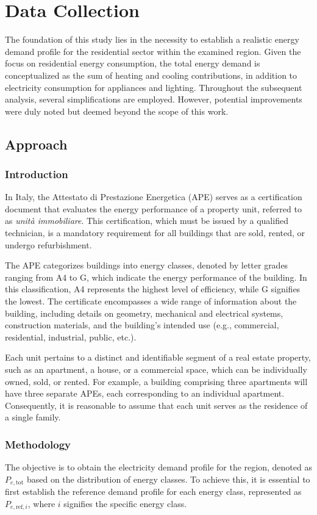 \section{Data Collection}
\label{sec:data-collection}
The foundation of this study lies in the necessity to establish a realistic energy demand profile for the residential sector within the examined region. Given the focus on residential energy consumption, the total energy demand is conceptualized as the sum of heating and cooling contributions, in addition to electricity consumption for appliances and lighting. Throughout the subsequent analysis, several simplifications are employed. However, potential improvements were duly noted but deemed beyond the scope of this work.

\subsection{Approach}
\subsubsection{Introduction}
In Italy, the Attestato di Prestazione Energetica (APE) serves as a certification document that evaluates the energy performance of a property unit, referred to as \textit{unità immobiliare}. This certification, which must be issued by a qualified technician, is a mandatory requirement for all buildings that are sold, rented, or undergo refurbishment.

The APE categorizes buildings into energy classes, denoted by letter grades ranging from A4 to G, which indicate the energy performance of the building. In this classification, A4 represents the highest level of efficiency, while G signifies the lowest. The certificate encompasses a wide range of information about the building, including details on geometry, mechanical and electrical systems, construction materials, and the building's intended use (e.g., commercial, residential, industrial, public, etc.).

Each unit pertains to a distinct and identifiable segment of a real estate property, such as an apartment, a house, or a commercial space, which can be individually owned, sold, or rented. For example, a building comprising three apartments will have three separate APEs, each corresponding to an individual apartment. Consequently, it is reasonable to assume that each unit serves as the residence of a single family.

\subsubsection{Methodology}
The objective is to obtain the electricity demand profile for the region, denoted as $P_{e, \text{tot}}$ based on the distribution of energy classes. To achieve this, it is essential to first establish the reference demand profile for each energy class, represented as $P_{e, \text{ref}, i}$, where $i$ signifies the specific energy class.

